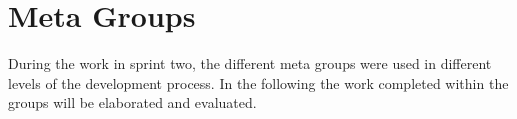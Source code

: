 \section{Meta Groups}
During the work in sprint two, the different meta groups were used in different levels of the development process. 
In the following the work completed within the groups will be elaborated and evaluated.





